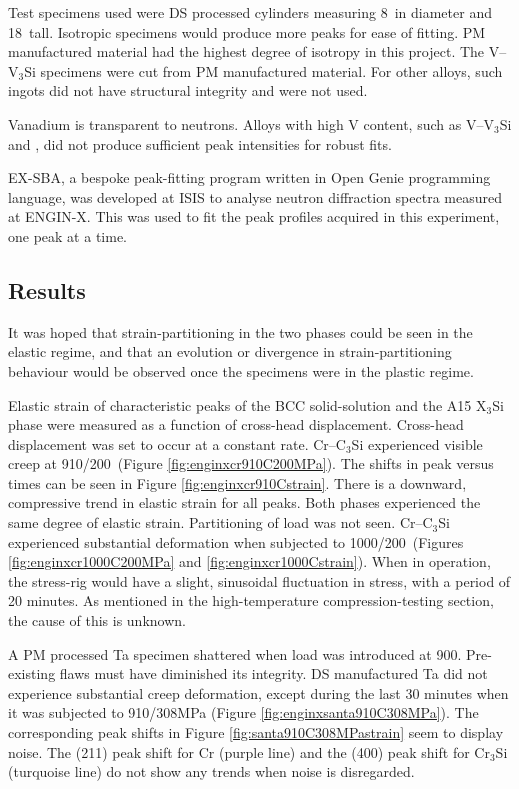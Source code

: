 Test specimens used were DS processed cylinders measuring 8\milli\metre\ in diameter and 18\milli\metre\ tall.  Isotropic specimens would produce more peaks for ease of fitting. PM manufactured material had the highest degree of isotropy in this project.  The V--V$_3$Si specimens were cut from PM manufactured material.  For other alloys, such ingots did not have structural integrity and were not used.    

Vanadium is transparent to neutrons.  Alloys with high V content, such as V--V$_3$Si and , did not produce sufficient peak intensities for robust fits.  

EX-SBA, a bespoke peak-fitting program written in Open Genie programming language, was developed at ISIS to analyse neutron diffraction spectra measured at ENGIN-X.  This was used to fit the peak profiles acquired in this experiment, one peak at a time.

\subsection{Results}
 
It was hoped that strain-partitioning in the two phases could be seen in the elastic regime, and that an evolution or divergence in strain-partitioning behaviour would be observed once the specimens were in the plastic regime.

Elastic strain of characteristic peaks of the BCC solid-solution and the A15 X$_3$Si phase were measured as a function of cross-head displacement.  Cross-head displacement was set to occur at a constant rate.  Cr--C$_3$Si experienced visible creep at 910\celsius/200\mega\pascal\ (Figure \ref{fig:enginxcr910C200MPa}).
The shifts in peak versus times can be seen in Figure \ref{fig:enginxcr910Cstrain}. There is a downward, compressive trend in elastic strain for all peaks.  Both phases experienced the same degree of elastic strain.  Partitioning of load was not seen.  Cr--C$_3$Si experienced substantial deformation when subjected to 1000\celsius/200\mega\pascal\ (Figures \ref{fig:enginxcr1000C200MPa} and \ref{fig:enginxcr1000Cstrain}).  When in operation, the stress-rig would have a slight, sinusoidal fluctuation in stress, with a period of 20 minutes.  As mentioned in the high-temperature compression-testing section, the cause of this is unknown.

A PM processed Ta specimen shattered when load was introduced at 900\celsius.  Pre-existing flaws must have diminished its integrity.  DS manufactured Ta did not experience substantial creep deformation, except during the last 30 minutes when it was subjected to 910\celsius/308MPa (Figure \ref{fig:enginxsanta910C308MPa}).  The corresponding peak shifts in Figure \ref{fig:santa910C308MPastrain} seem to display noise.  The (211) peak shift for Cr (purple line) and the (400) peak shift for Cr$_3$Si (turquoise line) do not show any trends when noise is disregarded.

